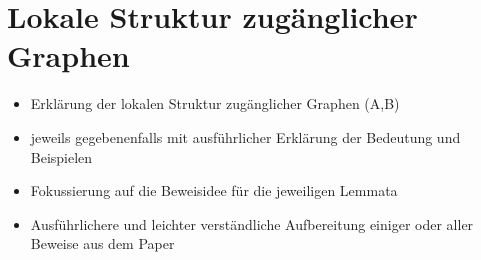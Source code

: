 \section{Lokale Struktur zugänglicher Graphen}
\label{sec/struktur_lokal}

\begin{itemize}
	\item Erklärung der lokalen Struktur zugänglicher Graphen (A,B)
	\item jeweils gegebenenfalls mit ausführlicher Erklärung der Bedeutung und Beispielen
	\item Fokussierung auf die Beweisidee für die jeweiligen Lemmata
	\item Ausführlichere und leichter verständliche Aufbereitung einiger oder aller Beweise aus dem Paper
\end{itemize}